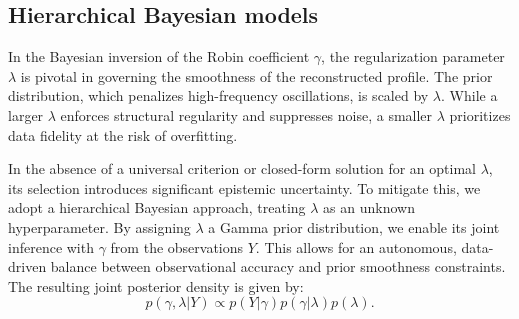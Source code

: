 \documentclass{ws-mplb}
\begin{document}
%
%


\subsection{Hierarchical Bayesian models }

In the Bayesian inversion of the Robin coefficient $\gamma$, the regularization parameter $\lambda$ is pivotal in governing the smoothness of the reconstructed profile. The prior distribution, which penalizes high-frequency oscillations, is scaled by $\lambda$. While a larger $\lambda$ enforces structural regularity and suppresses noise, a smaller $\lambda$ prioritizes data fidelity at the risk of overfitting.

In the absence of a universal criterion or closed-form solution for an optimal $\lambda$, its selection introduces significant epistemic uncertainty. To mitigate this, we adopt a hierarchical Bayesian approach, treating $\lambda$ as an unknown hyperparameter. By assigning $\lambda$ a Gamma prior distribution, we enable its joint inference with $\gamma$ from the observations $Y$. This allows for an autonomous, data-driven balance between observational accuracy and prior smoothness constraints. The resulting joint posterior density is given by:
$$ p(\gamma, \lambda | Y) \propto p(Y | \gamma) p(\gamma | \lambda) p(\lambda). $$
\end{document}
